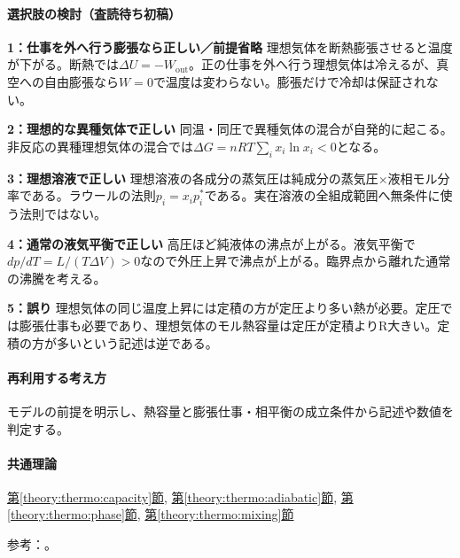 \paragraph{選択肢の検討（査読待ち初稿）}\mbox{}\par

\noindent\textbf{1：仕事を外へ行う膨張なら正しい／前提省略} 理想気体を断熱膨張させると温度が下がる。断熱では\(\Delta U=-W_{\mathrm{out}}\)。正の仕事を外へ行う理想気体は冷えるが、真空への自由膨張なら\(W=0\)で温度は変わらない。膨張だけで冷却は保証されない。\par

\noindent\textbf{2：理想的な異種気体で正しい} 同温・同圧で異種気体の混合が自発的に起こる。非反応の異種理想気体の混合では\(\Delta G=nRT\sum_i x_i\ln x_i<0\)となる。\par

\noindent\textbf{3：理想溶液で正しい} 理想溶液の各成分の蒸気圧は純成分の蒸気圧×液相モル分率である。ラウールの法則\(p_i=x_i p_i^*\)である。実在溶液の全組成範囲へ無条件に使う法則ではない。\par

\noindent\textbf{4：通常の液気平衡で正しい} 高圧ほど純液体の沸点が上がる。液気平衡で\(dp/dT=L/(T\Delta V)>0\)なので外圧上昇で沸点が上がる。臨界点から離れた通常の沸騰を考える。\par

\noindent\textbf{5：誤り} 理想気体の同じ温度上昇には定積の方が定圧より多い熱が必要。定圧では膨張仕事も必要であり、理想気体のモル熱容量は定圧が定積よりR大きい。定積の方が多いという記述は逆である。\par

\paragraph{再利用する考え方} モデルの前提を明示し、熱容量と膨張仕事・相平衡の成立条件から記述や数値を判定する。

\paragraph{共通理論} \hyperref[theory:thermo:capacity]{第\ref*{theory:thermo:capacity}節}, \hyperref[theory:thermo:adiabatic]{第\ref*{theory:thermo:adiabatic}節}, \hyperref[theory:thermo:phase]{第\ref*{theory:thermo:phase}節}, \hyperref[theory:thermo:mixing]{第\ref*{theory:thermo:mixing}節}

\par 参考：\cite{mit_thermo_adiabatic2008,mit_clapeyron2008,mit_solutions2008}。

